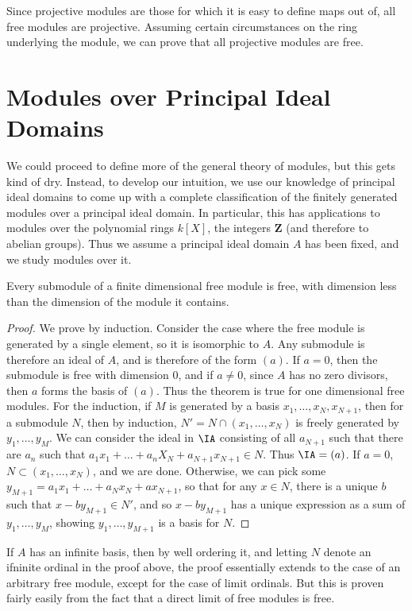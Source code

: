 Since projective modules are those for which it is easy to define maps out of, all free modules are projective. Assuming certain circumstances on the ring underlying the module, we can prove that all projective modules are free.

\section{Modules over Principal Ideal Domains}

We could proceed to define more of the general theory of modules, but this gets kind of dry. Instead, to develop our intuition, we use our knowledge of principal ideal domains to come up with a complete classification of the finitely generated modules over a principal ideal domain. In particular, this has applications to modules over the polynomial rings $k[X]$, the integers $\mathbf{Z}$ (and therefore to abelian groups). Thus we assume a principal ideal domain $A$ has been fixed, and we study modules over it.

\begin{theorem}
    Every submodule of a finite dimensional free module is free, with dimension less than the dimension of the module it contains.
\end{theorem}
\begin{proof}
    We prove by induction. Consider the case where the free module is generated by a single element, so it is isomorphic to $A$. Any submodule is therefore an ideal of $A$, and is therefore of the form $(a)$. If $a = 0$, then the submodule is free with dimension $0$, and if $a \neq 0$, since $A$ has no zero divisors, then $a$ forms the basis of $(a)$. Thus the theorem is true for one dimensional free modules. For the induction, if $M$ is generated by a basis $x_1, \dots, x_N, x_{N+1}$, then for a submodule $N$, then by induction, $N' = N \cap (x_1, \dots, x_N)$ is freely generated by $y_1, \dots, y_M$. We can consider the ideal in $\IA$ consisting of all $a_{N+1}$ such that there are $a_n$ such that $a_1x_1 + \dots + a_nX_N + a_{N+1} x_{N+1} \in N$. Thus $\IA = (a)$. If $a = 0$, $N \subset (x_1, \dots, x_N)$, and we are done. Otherwise, we can pick some $y_{M+1} = a_1x_1 + \dots + a_Nx_N + a x_{N+1}$, so that for any $x \in N$, there is a unique $b$ such that $x - by_{M+1} \in N'$, and so $x - by_{M+1}$ has a unique expression as a sum of $y_1, \dots, y_M$, showing $y_1, \dots, y_{M+1}$ is a basis for $N$.
\end{proof}

\begin{remark}
    If $A$ has an infinite basis, then by well ordering it, and letting $N$ denote an ifninite ordinal in the proof above, the proof essentially extends to the case of an arbitrary free module, except for the case of limit ordinals. But this is proven fairly easily from the fact that a direct limit of free modules is free.
\end{remark}

